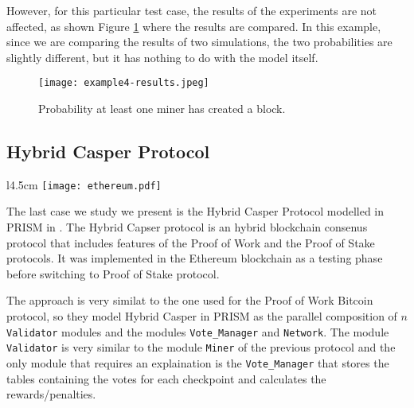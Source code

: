 However, for this particular test case, the results of the experiments are not affected, 
as shown Figure \ref{ex3-res} where the results are compared.
In this example, since we are comparing the results of two simulations, the two probabilities are
slightly different, but it has nothing to do with the model itself.
\begin{figure}[h]
\centering
\texttt{[image: example4-results.jpeg]}	
\caption{Probability at least one miner has created a block.}
\label{ex3-res}
\end{figure}


\subsection{Hybrid Casper Protocol}
\begin{wrapfigure}[9]{l}{4.5cm}
	\texttt{[image: ethereum.pdf]}	
\end{wrapfigure} 
The last case we study we present is the Hybrid Casper Protocol modelled in PRISM in \cite{DBLP:journals/distribledger/GallettaLMV23}. 
The Hybrid Capser protocol is
an hybrid blockchain consenus protocol that includes features of the Proof of Work and the Proof of Stake protocols.
It was implemented in the Ethereum blockchain \cite{ethereum} as a testing phase before switching to Proof of Stake protocol.

The approach is very similat to the one used for the Proof of Work Bitcoin protocol,
so they model Hybrid Casper in PRISM as the parallel composition of $n$ \texttt{Validator} modules and the modules \texttt{Vote\_Manager} and \texttt{Network}.
The module \texttt{Validator} is very similar to the module \texttt{Miner} of the previous protocol and
the only module that requires an explaination is the \texttt{Vote\_Manager} that stores the tables containing the votes for each checkpoint and calculates the rewards/penalties.

